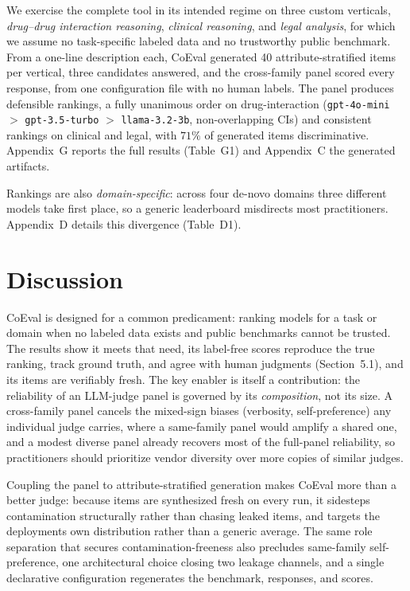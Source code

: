 We exercise the complete tool in its intended regime on three custom verticals,
\emph{drug--drug interaction reasoning}, \emph{clinical reasoning}, and \emph{legal analysis}, for
which we assume no task-specific labeled data and no trustworthy public benchmark. From a one-line description
each, CoEval generated 40 attribute-stratified items per vertical, three candidates answered, and the
cross-family panel scored every response, from one configuration file with no human labels. The panel produces
defensible rankings, a fully unanimous order on drug-interaction (\texttt{gpt-4o-mini} \(>\)
\texttt{gpt-3.5-turbo} \(>\) \texttt{llama-3.2-3b}, non-overlapping CIs) and consistent rankings on clinical
and legal, with \(71\%\) of generated items discriminative. Appendix~G reports the full results
(Table~G1) and Appendix~C the generated artifacts.

Rankings are also \emph{domain-specific}: across four de-novo domains three different models take first place,
so a generic leaderboard misdirects most practitioners. Appendix~D details this divergence (Table~D1).

\section{Discussion}\label{discussion}

CoEval is designed for a common predicament: ranking models for a task or domain when no labeled data exists and public
benchmarks cannot be trusted. The results show it meets that need, its label-free scores reproduce the true ranking,
track ground truth, and agree with human judgments (Section~5.1), and its items are verifiably fresh. The key
enabler is itself a contribution: the reliability of an LLM-judge panel is governed by its \emph{composition}, not its
size. A cross-family panel cancels the mixed-sign biases (verbosity, self-preference) any individual judge carries,
where a same-family panel would amplify a shared one, and a modest diverse panel already recovers most of the
full-panel reliability, so practitioners should prioritize vendor diversity over more copies of similar judges.

Coupling the panel to attribute-stratified generation makes CoEval more than a better judge: because items are
synthesized fresh on every run, it sidesteps contamination structurally rather than chasing leaked items, and targets
the deployment\textquotesingle s own distribution rather than a generic average. The same role separation that secures
contamination-freeness also precludes same-family self-preference, one architectural choice closing two leakage
channels, and a single declarative configuration regenerates the benchmark, responses, and scores.

